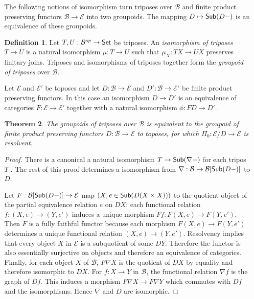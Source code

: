 \documentclass[sort&compress]{elsarticle}
\theoremstyle{plain}
\newtheorem{theorem}{Theorem}
\theoremstyle{definition}
\newtheorem{defin}[theorem]{Definition}
\theoremstyle{remark}
\newcommand\cat\mathcal
\begin{document}
The following notions of isomorphism turn triposes over $\cat B$ and finite product preserving functors $\cat B \to \cat E$ into two groupoids. The mapping $D\mapsto \mathsf{Sub}(D-)$ is an equivalence of these groupoids.%

\begin{defin} Let $T,U:\cat B\dual \to \Set$ be triposes. An \emph{isomorphism of triposes} $T\to U$ is a natural isomorphism $\mu:T\to U$ such that $\mu_X:TX \to UX$ preserves finitary joins. Triposes and isomorphisms of triposes together form the \emph{groupoid of triposes} over $\cat B$.

Let $\cat E$ and $\cat E'$ be toposes and let $D:\cat B\to\cat E$ and $D':\cat B\to\cat E'$ be finite product preserving functors. In this case an isomorphism $D\to D'$ is an equivalence of categories $F:\cat E\to \cat E'$ together with a natural isomorphism $\phi:FD \to D'$. \end{defin} 

\begin{theorem} The groupoids of triposes over $\cat B$ is equivalent to the groupoid of finite product preserving functors $D:\cat B \to \cat E$ to toposes, for which $\Pi_0:\cat E/D \to \cat E$ is resolvent. \end{theorem}

\begin{proof} There is a canonical a natural isomorphism $T \to \mathsf{Sub}(\nabla -)$ for each tripos $T$ \citep{a2CAotTtTC}.
The rest of this proof determines a isomorphism from $\nabla:\cat B \to \cat B[\sub(D-)]$ to $D$.

Let $F:\cat B[\sub(D-)] \to\cat E$ map $(X,e \in \mathsf{Sub}(D(X\times X)))$ to the quotient object of the partial equivalence relation $e$ on $DX$; each functional relation $f:(X,e) \to (Y,e')$ induces a unique morphism $Ff:F(X,e) \to F(Y,e')$. Then $F$ is a fully faithful functor because each morphism $F(X,e) \to F(Y,e')$ determines a unique functional relation $(X,e) \to (Y,e')$. Resolvency implies that every object $X$ in $\cat E$ is a subquotient of some $DY$. Therefore the functor is also essentially surjective on objects and therefore an equivalence of categories. Finally, for each object $X$ of $\cat B$, $F\nabla X$ is the quotient of $DX$ by equality and therefore isomorphic to $DX$. For $f:X\to Y$ in $\cat B$, the functional relation $\nabla f$ is the graph of $Df$. This induces a morphism $F\nabla X \to F\nabla Y$ which commutes with $Df$ and the isomorphisms. Hence $\nabla$ and $D$ are isomorphic.
\end{proof}
\end{document}
